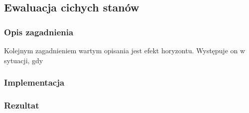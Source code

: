 \subsection{Ewaluacja cichych stanów}
\label{subsec:ewaluacja-cichych-stanow}

\subsubsection{Opis zagadnienia}
Kolejnym zagadnieniem wartym opisania jest efekt horyzontu.
Występuje on w sytuacji, gdy

\subsubsection{Implementacja}

\subsubsection{Rezultat}
